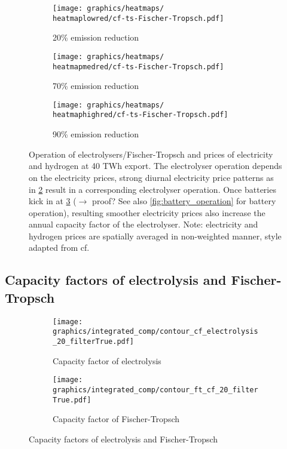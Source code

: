\begin{figure}[h]
\begin{subfigure}[h]{0.33\textwidth}
    \end{subfigure}


    \begin{subfigure}[h]{0.33\textwidth}
        \centering
        \texttt{[image: graphics/heatmaps/\\heatmaplowred/cf-ts-Fischer-Tropsch.pdf]}
        \caption{20\% emission reduction}
        \label{fig:operation20}
    \end{subfigure}
    \begin{subfigure}[h]{0.33\textwidth}
        \centering
        \texttt{[image: graphics/heatmaps/\\heatmapmedred/cf-ts-Fischer-Tropsch.pdf]}
        \caption{70\% emission reduction}
        \label{fig:operation70}
    \end{subfigure}
    \begin{subfigure}[h]{0.33\textwidth}
        \centering
        \texttt{[image: graphics/heatmaps/\\heatmaphighred/cf-ts-Fischer-Tropsch.pdf]}
        \caption{90\% emission reduction}
        \label{fig:operation90}
    \end{subfigure}

    \caption{Operation of electrolysers/Fischer-Tropsch and prices of electricity and hydrogen at 40 TWh export. The electrolyser operation depends on the electricity prices, strong diurnal electricity price patterns as in \ref{fig:operation70} result in a corresponding electrolyser operation. Once batteries kick in at \ref{fig:operation90} ($\rightarrow$ proof? See also \ref{fig:battery_operation} for battery operation), resulting smoother electricity prices also increase the annual capacity factor of the electrolyser. Note: electricity and hydrogen prices are spatially averaged in non-weighted manner, style adapted from cf. \cite{Neumann2022}}
    \label{fig:operation-ely-ft}
\end{figure}



\subsection{Capacity factors of electrolysis and Fischer-Tropsch}

\begin{figure*}[h] %
    \centering
    \begin{subfigure}[b]{0.49\linewidth}
        \centering
        \texttt{[image: graphics/integrated\_comp/contour\_cf\_electrolysis\_20\_filterTrue.pdf]}
        \caption{Capacity factor of electrolysis}
        \label{fig:cf-ely}
    \end{subfigure}
    \hfill
    \begin{subfigure}[b]{0.49\linewidth}
        \centering
        \texttt{[image: graphics/integrated\_comp/contour\_ft\_cf\_20\_filterTrue.pdf]}
        \caption{Capacity factor of Fischer-Tropsch}
        \label{fig:cf-ft}
    \end{subfigure}
    \hfill
    \caption{Capacity factors of electrolysis and Fischer-Tropsch}
    \label{fig:cf-ely-ft}
\end{figure*}



\clearpage